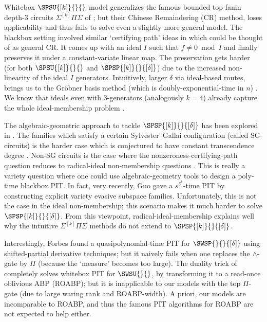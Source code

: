Whitebox $\SPSU{[k]}{}{}$ model generalizes the famous bounded top fanin depth-$3$ circuits $\Sigma^{[k]}\Pi\Sigma$ of  \cite{kayal2007polynomial}; but their Chinese Remaindering (CR) method, loses applicability and thus fails to solve even a slightly more general model. The blackbox setting involved similar `certifying path' ideas in \cite{saxena2012blackbox} which could be thought of as general CR. It comes up with an ideal $I$ such that $f \ne 0 \bmod I$ and finally preserves it under a constant-variate linear map. The preservation gets harder (for both $\SPSU{[k]}{}{}$ and $\SPSP{[k]}{}{[\delta]}$) due to the increased non-linearity of the ideal $I$ generators. Intuitively, larger $\delta$ via ideal-based routes, brings us to the Gr\"obner basis method (which is doubly-exponential-time in $n$) \cite{vasconcelos2004computational}. We know that ideals even with $3$-generators (analogously $k=4$) already capture the whole ideal-membership problem \cite{sap19}.

The algebraic-geometric approach to tackle $\SPSP{[k]}{}{[\delta]}$ has been explored in \cite{beecken2013algebraic,gupta2014algebraic,mukhopadhyay2016depth,zeyu2021variety}. The families which satisfy a certain Sylvester–Gallai configuration (called SG-circuits) is the harder case which is conjectured to have constant transcendence degree \cite[Conj.~1]{gupta2014algebraic}. Non-SG circuits is the case where the nonzeroness-certifying-path question reduces to radical-ideal  non-membership questions \cite{garg2020special}. This is really a variety question where one could use algebraic-geometry tools to design a poly-time blackbox PIT. In fact, very recently, Guo \cite{zeyu2021variety} gave a $s^{\delta^k}$-time PIT by constructing explicit variety evasive subspace families. Unfortunately, this is not the case in the ideal non-membership; this scenario makes it much harder to solve $\SPSP{[k]}{}{[\delta]}$. From this viewpoint, radical-ideal-membership explains well why the intuitive $\Sigma^{[k]} \Pi \Sigma$ methods do not extend to  $\SPSP{[k]}{}{[\delta]}$.

Interestingly, Forbes \cite{forbes2015deterministic} found a quasipolynomial-time PIT for $\SWSP{}{}{[\delta]}$ using shifted-partial derivative techniques; but it naively fails when one replaces the $\wedge$-gate by $\Pi$ (because the `measure' becomes too large). The duality trick of \cite{saxena2008diagonal} completely solves whitebox PIT for $\SWSU{}{}$, by transforming it to a read-once oblivious ABP (ROABP); but it is inapplicable to our models with the top $\Pi$-gate (due to large waring rank and ROABP-width). A priori, our models are incomparable to ROABP, and thus the famous PIT algorithms for ROABP \cite{forbes2013quasipolynomial,forbes2014hitting,gurjarARO} are not expected to help either.

